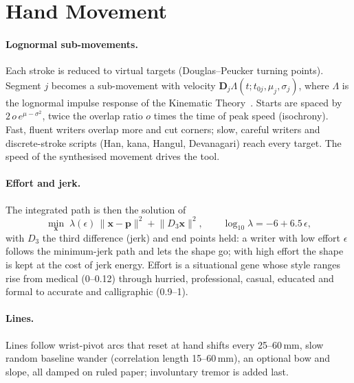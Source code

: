 \documentclass[10pt,twocolumn]{article}
\begin{document}
\section{Hand Movement}
\label{sec:motion}

\paragraph{Lognormal sub-movements.} Each stroke is reduced to virtual targets (Douglas--Peucker turning points).
Segment $j$ becomes a sub-movement with velocity $\mathbf{D}_j\Lambda(t;t_{0j},\mu_j,\sigma_j)$, where $\Lambda$ is
the lognormal impulse response of the Kinematic Theory~\cite{plamondon1995}. Starts are spaced by
$2\,o\,e^{\mu-\sigma^2}$, twice the overlap ratio $o$ times the time of peak speed (isochrony). Fast, fluent
writers overlap more and cut corners; slow, careful writers and discrete-stroke scripts (Han, kana, Hangul,
Devanagari) reach every target. The speed of the synthesised movement drives the tool.

\paragraph{Effort and jerk.} The integrated path is then the solution of
\begin{equation}
  \min_{\mathbf{x}}\;\lambda(\epsilon)\,\lVert\mathbf{x}-\mathbf{p}\rVert^2+\lVert D_3\mathbf{x}\rVert^2,
  \qquad \log_{10}\lambda=-6+6.5\,\epsilon,
\end{equation}
with $D_3$ the third difference (jerk) and end points held: a writer with low effort $\epsilon$ follows the
minimum-jerk path and lets the shape go; with high effort the shape is kept at the cost of jerk energy. Effort is a
situational gene whose style ranges rise from medical (0--0.12) through hurried, professional, casual, educated and
formal to accurate and calligraphic (0.9--1).

\paragraph{Lines.} Lines follow wrist-pivot arcs that reset at hand shifts every 25--60\,mm, slow random baseline
wander (correlation length 15--60\,mm), an optional bow and slope, all damped on ruled paper; involuntary tremor
is added last.

\end{document}
